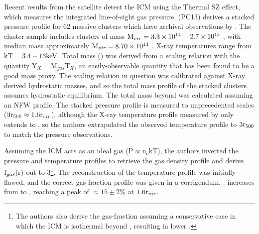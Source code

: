 

Recent results from the \Planck{} satellite detect the ICM using the
Thermal SZ effect, which measures the integrated line-of-sight gas
pressure. \textbf{\citet{PlanckIntV}} (PC13) derives a stacked pressure
profile for 62 massive clusters which have archival observations by
\XMM. The cluster sample \citep[detailed in][]{PlanckEarlyXI} includes
clusters of mass $\textrm{M\ensuremath{_{vir}}} = 3.3\times 10^{14}$ -- $2.7 \times 10^{15}$ \Msun,
with median mass approximately $\textrm{M\ensuremath{_{vir}}} = 8.70 \times 10^{14}$ \Msun. X-ray
temperatures range from $\textrm{kT} = 3.4$ -- $13 \textrm{keV}$. Total mass
(\Mfive) was derived from a scaling relation with the quantity
$\textrm{Y}_X = \textrm{M}_{gas}\textrm{T}_X$, an easily-observable
quantity that has been found to be a good mass proxy. The scaling
relation in question \citep{Arnaud2010} was calibrated against X-ray
derived hydrostatic masses, and so the total mass profile of the
stacked \Planck{} clusters assumes hydrostatic equilibrium. The total
mass beyond \rfive{} was calculated assuming an NFW profile. The
stacked pressure profile is measured to unprecedented scales ($3\textrm{r\ensuremath{_{500}}}
\approx 1.6\textrm{r\ensuremath{_{vir}}}$), although the X-ray temperature profile measured by
\XMM{} only extends to \rfive{}, so the authors extrapolated the
observed temperature profile to $3\textrm{r\ensuremath{_{500}}}{}$ to match the pressure
observations.

Assuming the ICM acts as an ideal gas ($\textrm{P} \propto
\textrm{n}_\textrm{e}\textrm{kT}$), the authors inverted the pressure
and temperature profiles to retrieve the gas density profile and
derive $\textrm{f\ensuremath{_{gas}}}{}(\textrm{r})$ out to 3\rfive{}\footnote{The authors also
  derive the gas-fraction assuming a conservative case in which the
  ICM is isothermal beyond \rfive{}, resulting in lower \fg{}.}. The
reconstruction of the temperature profile was initially flawed, and
the correct gas fraction profile was given in a corrigendum,
\citet{PlanckIntVb}. \fg{} increases from \rfive{} to \rvir{}
\citep[as predicted by][see \ref{sec:Gas.Extrapolation}]{Rasheed2011},
reaching a peak of $\approx 15\pm2\%$ at $1.6\textrm{r\ensuremath{_{vir}}}{}$.

